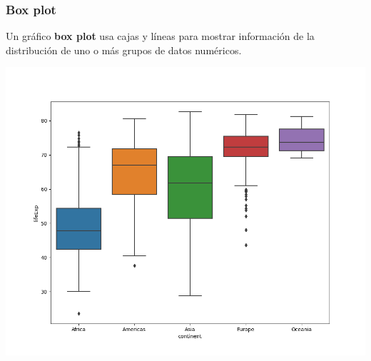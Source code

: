\documentclass[aspectratio=169,12pt]{beamer}
\begin{document}
\begin{frame}
\frametitle{Box plot}

Un gráfico \textbf{box plot} usa cajas y líneas para mostrar información de la distribución de uno o más grupos de datos numéricos.

\begin{center}
\includegraphics[scale=.3]{practica3-img-gapminder-boxplot.png}
\end{center}

\end{frame}

\end{document}

